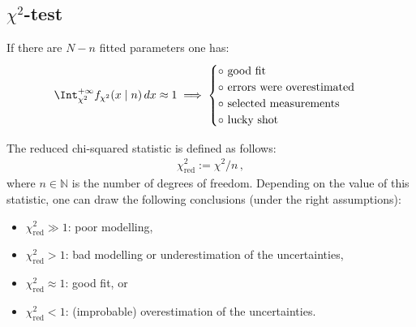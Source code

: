 
\subsection{\texorpdfstring{$\chi^2$}{Chi squared}-test}\label{section:chi_squared_test}

    \begin{property}\label{statistics:chi_square}
        If there are $N-n$ fitted parameters one has:
        \begin{gather}
            \Int_{\chi^2}^{+\infty}f_{\chi^2}(x\mid n)\,dx\approx 1\implies
            \begin{cases}
                \circ\text{  good fit}\\
                \circ\text{  errors were overestimated}\\
                \circ\text{  selected measurements}\\
                \circ\text{  lucky shot}
            \end{cases}
        \end{gather}
    \end{property}
    \begin{property}
        The reduced chi-squared statistic is defined as follows:
        \begin{gather}
            \chi^2_{\text{red}} := \chi^2/n\,,
        \end{gather}
        where $n\in\mathbb{N}$ is the number of degrees of freedom. Depending on the value of this statistic, one can draw the following conclusions (under the right assumptions):
        \begin{itemize}
            \item $\chi^2_{\text{red}}\gg1$: poor modelling,
            \item $\chi^2_{\text{red}}>1$: bad modelling or underestimation of the uncertainties,
            \item $\chi^2_{\text{red}}\approx1$: good fit, or
            \item $\chi^2_{\text{red}}<1$: (improbable) overestimation of the uncertainties.
        \end{itemize}
    \end{property}

